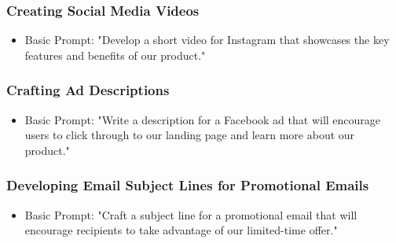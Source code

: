 \begin{frame}[fragile]\frametitle{Creating Social Media Videos}
\begin{itemize}
\item Basic Prompt: "Develop a short video for Instagram that showcases the key features and benefits of our product."
\end{itemize}
\end{frame}

\begin{frame}[fragile]\frametitle{Crafting Ad Descriptions}
\begin{itemize}
\item Basic Prompt: "Write a description for a Facebook ad that will encourage users to click through to our landing page and learn more about our product."
\end{itemize}
\end{frame}

\begin{frame}[fragile]\frametitle{Developing Email Subject Lines for Promotional Emails}
\begin{itemize}
\item Basic Prompt: "Craft a subject line for a promotional email that will encourage recipients to take advantage of our limited-time offer."
\end{itemize}
\end{frame}

